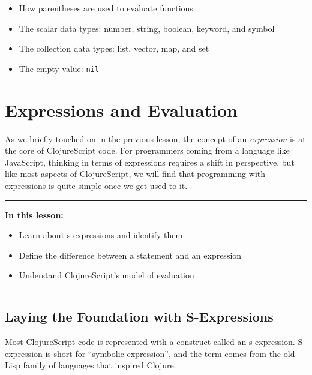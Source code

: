 \documentclass[10pt,twoside,openright]{memoir}
\begin{document}
\begin{itemize}
\tightlist
\item
  How parentheses are used to evaluate functions
\item
  The scalar data types: number, string, boolean, keyword, and symbol
\item
  The collection data types: list, vector, map, and set
\item
  The empty value: \texttt{nil}
\end{itemize}

\chapter{Expressions and Evaluation}

As we briefly touched on in the previous lesson, the concept of an
\emph{expression} is at the core of ClojureScript code. For programmers
coming from a language like JavaScript, thinking in terms of expressions
requires a shift in perspective, but like most aspects of ClojureScript,
we will find that programming with expressions is quite simple once we
get used to it.

\begin{center}\rule{0.5\linewidth}{0.5pt}\end{center}

\textbf{In this lesson:}

\begin{itemize}
\tightlist
\item
  Learn about s-expressions and identify them
\item
  Define the difference between a statement and an expression
\item
  Understand ClojureScript's model of evaluation
\end{itemize}

\begin{center}\rule{0.5\linewidth}{0.5pt}\end{center}

\section{Laying the Foundation with S-Expressions}

Most ClojureScript code is represented with a construct called an
s-expression. S-expression is short for ``symbolic expression'', and the
term comes from the old Lisp family of languages that inspired Clojure.
\end{document}
